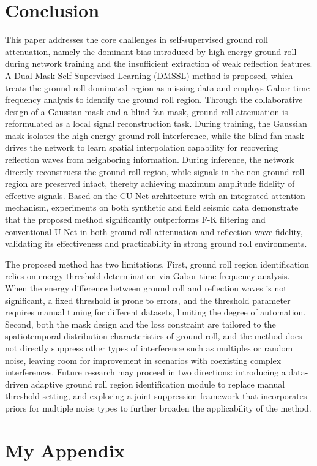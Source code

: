 \documentclass[a4paper,fleqn]{cas-dc}
\begin{document}
\section{Conclusion}
This paper addresses the core challenges in self-supervised ground roll attenuation, namely 
the dominant bias introduced by high-energy ground roll during network training and the 
insufficient extraction of weak reflection features. A Dual-Mask Self-Supervised Learning 
(DMSSL) method is proposed, which treats the ground roll-dominated region as missing data 
and employs Gabor time-frequency analysis to identify the ground roll region. Through the 
collaborative design of a Gaussian mask and a blind-fan mask, ground roll attenuation is 
reformulated as a local signal reconstruction task. During training, the Gaussian mask 
isolates the high-energy ground roll interference, while the blind-fan mask drives the 
network to learn spatial interpolation capability for recovering reflection waves from 
neighboring information. During inference, the network directly reconstructs the ground 
roll region, while signals in the non-ground roll region are preserved intact, thereby 
achieving maximum amplitude fidelity of effective signals. Based on the CU-Net architecture 
with an integrated attention mechanism, experiments on both synthetic and field seismic data 
demonstrate that the proposed method significantly outperforms F-K filtering and conventional 
U-Net in both ground roll attenuation and reflection wave fidelity, validating its 
effectiveness and practicability in strong ground roll environments.

The proposed method has two limitations. First, ground roll region identification relies on 
energy threshold determination via Gabor time-frequency analysis. When the energy difference 
between ground roll and reflection waves is not significant, a fixed threshold is prone to 
errors, and the threshold parameter requires manual tuning for different datasets, limiting 
the degree of automation. Second, both the mask design and the loss constraint are tailored 
to the spatiotemporal distribution characteristics of ground roll, and the method does not 
directly suppress other types of interference such as multiples or random noise, leaving room 
for improvement in scenarios with coexisting complex interferences. Future research may proceed 
in two directions: introducing a data-driven adaptive ground 
roll region identification module to replace manual threshold setting, and exploring a 
joint suppression framework that incorporates priors for multiple noise types to further 
broaden the applicability of the method.
\appendix
\section{My Appendix}
\printcredits

%


\end{document}

